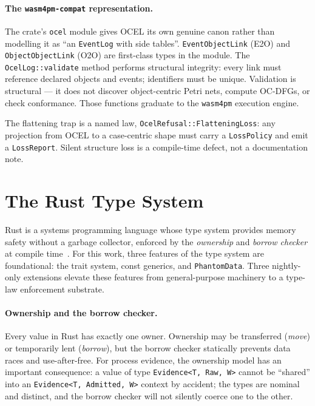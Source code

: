 \paragraph{The \texttt{wasm4pm-compat} representation.}
The crate's \texttt{ocel} module gives OCEL its own genuine canon rather than
modelling it as ``an \texttt{EventLog} with side tables''.
\texttt{EventObjectLink} (E2O) and \texttt{ObjectObjectLink} (O2O) are
first-class types in the module. The \texttt{OcelLog::validate} method performs
structural integrity: every link must reference declared objects and events;
identifiers must be unique. Validation is structural --- it does not discover
object-centric Petri nets, compute OC-DFGs, or check conformance.
Those functions graduate to the \texttt{wasm4pm} execution engine.

The flattening trap is a named law, \texttt{OcelRefusal::FlatteningLoss}:
any projection from OCEL to a case-centric shape must carry a
\texttt{LossPolicy} and emit a \texttt{LossReport}. Silent structure loss
is a compile-time defect, not a documentation note.

\section{The Rust Type System}
\label{sec:bg-rust}

Rust is a systems programming language whose type system provides memory safety
without a garbage collector, enforced by the \emph{ownership} and
\emph{borrow checker} at compile time~\cite{matsakis2014rust}. For this work,
three features of the type system are foundational: the trait system, const
generics, and \texttt{PhantomData}. Three nightly-only extensions elevate these
features from general-purpose machinery to a type-law enforcement substrate.

\paragraph{Ownership and the borrow checker.}
Every value in Rust has exactly one owner. Ownership may be transferred
(\emph{move}) or temporarily lent (\emph{borrow}), but the borrow checker
statically prevents data races and use-after-free. For process evidence, the
ownership model has an important consequence: a value of type
\texttt{Evidence<T, Raw, W>} cannot be ``shared'' into an
\texttt{Evidence<T, Admitted, W>} context by accident; the types are nominal
and distinct, and the borrow checker will not silently coerce one to the other.

